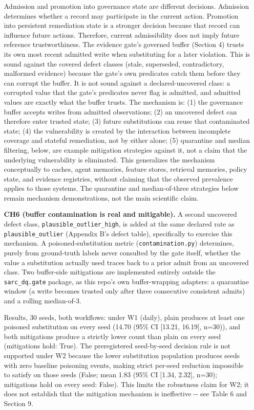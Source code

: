 \documentclass[11pt,a4paper]{article}
\theoremstyle{definition}
\begin{document}
Admission and promotion into governance state are different decisions. Admission determines whether a record may participate in the current action. Promotion into persistent remediation state is a stronger decision because that record can influence future actions. Therefore, current admissibility does not imply future reference trustworthiness. The evidence gate's governed buffer (Section 4) trusts its own most recent admitted write when substituting for a later violation. This is sound against the covered defect classes (stale, superseded, contradictory, malformed evidence) because the gate's own predicates catch them before they can corrupt the buffer. It is not sound against a declared-uncovered class: a corrupted value that the gate's predicates never flag is admitted, and admitted values are exactly what the buffer trusts. The mechanism is: (1) the governance buffer accepts writes from admitted observations; (2) an uncovered defect can therefore enter trusted state; (3) future substitutions can reuse that contaminated state; (4) the vulnerability is created by the interaction between incomplete coverage and stateful remediation, not by either alone; (5) quarantine and median filtering, below, are example mitigation strategies against it, not a claim that the underlying vulnerability is eliminated. This generalizes the mechanism conceptually to caches, agent memories, feature stores, retrieval memories, policy state, and evidence registries, without claiming that the observed prevalence applies to those systems. The quarantine and median-of-three strategies below remain mechanism demonstrations, not the main scientific claim.

\noindent\textbf{CH6 (buffer contamination is real and mitigable).} A second uncovered defect class, \texttt{plausible\_outlier\_high}, is added at the same declared rate as \texttt{plausible\_outlier} (Appendix B's defect table), specifically to exercise this mechanism. A poisoned-substitution metric (\texttt{contamination.py}) determines, purely from ground-truth labels never consulted by the gate itself, whether the value a substitution actually used traces back to a prior admit from an uncovered class. Two buffer-side mitigations are implemented entirely outside the \texttt{sarc\_dq.gate} package, as this repo's own buffer-wrapping adapters: a quarantine window (a write becomes trusted only after three consecutive consistent admits) and a rolling median-of-3.

Results, 30 seeds, both workflows: under W1 (daily), plain produces at least one poisoned substitution on every seed (14.70 (95\% CI [13.21, 16.19], n=30)), and both mitigations produce a strictly lower count than plain on every seed (mitigations hold: True). The preregistered seed-by-seed decision rule is not supported under W2 because the lower substitution population produces seeds with zero baseline poisoning events, making strict per-seed reduction impossible to satisfy on those seeds (False; mean 1.83 (95\% CI [1.34, 2.32], n=30); mitigations hold on every seed: False). This limits the robustness claim for W2; it does not establish that the mitigation mechanism is ineffective -{}- see Table 6 and Section 9.
\end{document}
